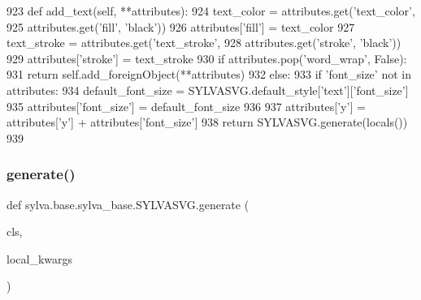 \begin{DoxyCode}
923     \textcolor{keyword}{def }add\_text(self, **attributes):
924         text\_color = attributes.get(\textcolor{stringliteral}{'text\_color'},
925                                     attributes.get(\textcolor{stringliteral}{'fill'}, \textcolor{stringliteral}{'black'}))
926         attributes[\textcolor{stringliteral}{'fill'}] = text\_color
927         text\_stroke = attributes.get(\textcolor{stringliteral}{'text\_stroke'},
928                                      attributes.get(\textcolor{stringliteral}{'stroke'}, \textcolor{stringliteral}{'black'}))
929         attributes[\textcolor{stringliteral}{'stroke'}] = text\_stroke
930         \textcolor{keywordflow}{if} attributes.pop(\textcolor{stringliteral}{'word\_wrap'}, \textcolor{keyword}{False}):
931             \textcolor{keywordflow}{return} self.add\_foreignObject(**attributes)
932         \textcolor{keywordflow}{else}:
933             \textcolor{keywordflow}{if} \textcolor{stringliteral}{'font\_size'} \textcolor{keywordflow}{not} \textcolor{keywordflow}{in} attributes:
934                 default\_font\_size = SYLVASVG.default\_style[\textcolor{stringliteral}{'text'}][\textcolor{stringliteral}{'font\_size'}]
935                 attributes[\textcolor{stringliteral}{'font\_size'}] = default\_font\_size
936 
937             attributes[\textcolor{stringliteral}{'y'}] = attributes[\textcolor{stringliteral}{'y'}] + attributes[\textcolor{stringliteral}{'font\_size'}]
938             \textcolor{keywordflow}{return} SYLVASVG.generate(locals())
939 
\end{DoxyCode}
\mbox{\label{classsylva_1_1base_1_1sylva__base_1_1_s_y_l_v_a_s_v_g_ae0e18ce2b9be0def86deee37cffbb8a7}} 
\subsubsection{\texorpdfstring{generate()}{generate()}}
{\footnotesize\ttfamily def sylva.\+base.\+sylva\+\_\+base.\+S\+Y\+L\+V\+A\+S\+V\+G.\+generate (\begin{DoxyParamCaption}\item[{}]{cls,  }\item[{}]{local\+\_\+kwargs }\end{DoxyParamCaption})}



